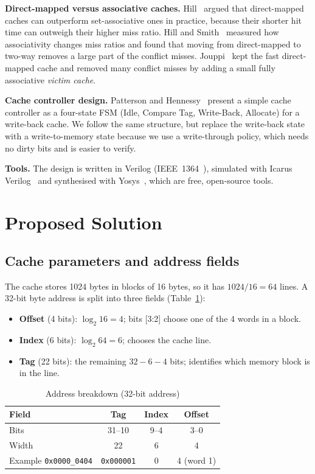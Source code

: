 \documentclass[conference]{IEEEtran}
\begin{document}
\textbf{Direct-mapped versus associative caches.} Hill~\cite{hill1988} argued that direct-mapped caches can
outperform set-associative ones in practice, because their shorter hit time can outweigh their higher miss ratio.
Hill and Smith~\cite{hill1989} measured how associativity changes miss ratios and found that moving from direct-mapped
to two-way removes a large part of the conflict misses. Jouppi~\cite{jouppi1990} kept the fast direct-mapped cache
and removed many conflict misses by adding a small fully associative \emph{victim cache}.

\textbf{Cache controller design.} Patterson and Hennessy~\cite{patterson2020} present a simple cache controller as a
four-state FSM (Idle, Compare Tag, Write-Back, Allocate) for a write-back cache. We follow the same structure, but
replace the write-back state with a write-to-memory state because we use a write-through policy, which needs no
dirty bits and is easier to verify.

\textbf{Tools.} The design is written in Verilog (IEEE~1364~\cite{ieee1364}), simulated with Icarus
Verilog~\cite{iverilog} and synthesised with Yosys~\cite{yosys}, which are free, open-source tools.

\section{Proposed Solution}

\subsection{Cache parameters and address fields}
The cache stores 1024 bytes in blocks of 16 bytes, so it has $1024/16 = 64$ lines. A 32-bit byte address is split
into three fields (Table~\ref{tab:addr}):
\begin{itemize}
\item \textbf{Offset} (4 bits): $\log_2 16 = 4$; bits [3:2] choose one of the 4 words in a block.
\item \textbf{Index} (6 bits): $\log_2 64 = 6$; chooses the cache line.
\item \textbf{Tag} (22 bits): the remaining $32-6-4$ bits; identifies which memory block is in the line.
\end{itemize}

\begin{table}[h]
\centering
\caption{Address breakdown (32-bit address)}
\label{tab:addr}
\begin{tabular}{lccc}
\toprule
Field & Tag & Index & Offset \\
\midrule
Bits  & 31--10 & 9--4 & 3--0 \\
Width & 22 & 6 & 4 \\
Example \texttt{0x0000\_0404} & \texttt{0x000001} & 0 & 4 (word 1) \\
\bottomrule
\end{tabular}
\end{table}
\end{document}
